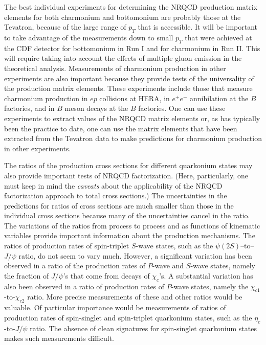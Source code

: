 The best individual experiments for determining the NRQCD production 
matrix elements for both charmonium and bottomonium are probably 
those at the Tevatron, because of the large range of $p_T$
that is accessible. It will be important to take advantage of the
measurements down to small $p_T$ that were achieved at the CDF
detector for bottomonium in Run I and for charmonium in Run II.  This
will require taking
into account the effects of multiple gluon emission in the theoretical
analysis.  
Measurements of charmonium production in other experiments
are also important because they provide tests of the universality of the
production matrix elements. These experiments include those that measure
charmonium production in $ep$ collisions at HERA,
in $e^+ e^-$ annihilation at the $B$ factories, and in
$B$ meson decays at the $B$ factories.  
One can use these experiments to extract values of
the NRQCD matrix elements or, as has typically been the practice to
date, one can use the matrix elements that have been extracted from the
Tevatron data to make predictions for charmonium production in other  
experiments.

The ratios of the production cross sections for different quarkonium
states may also provide important tests of NRQCD factorization.
(Here, particularly, one must keep in mind the {\it caveats} about the
applicability of the NRQCD factorization approach to total cross
sections.) The uncertainties in the predictions for ratios of cross
sections are much smaller than those in the individual cross
sections because many of the uncertainties cancel in the
ratio. The variations of the ratios from process to process and as
functions of kinematic variables provide important information
about the production mechanisms.  The ratios of production rates of
spin-triplet $S$-wave states, such as the 
$\psi(2S)$--to--$J/\psi$ ratio, do not seem to vary much. 
However, a significant variation has been observed in a ratio 
of the production rates of $P$-wave and $S$-wave states, 
namely the fraction of $J/\psi$'s that come from decays of $\chi_c$'s. 
A substantial variation has also been observed
in a ratio of production rates of $P$-wave states, 
namely the $\chi_{c1}$-to-$\chi_{c2}$ ratio. 
More precise measurements of these and other
ratios would be valuable.  Of particular importance would be
measurements of ratios of production rates of spin-singlet and
spin-triplet quarkonium states, such as the 
$\eta_c$-to-$J/\psi$ ratio.
 The absence of clean signatures for spin-singlet quarkonium
states makes such measurements difficult.

